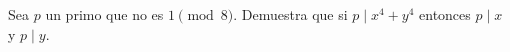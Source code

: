 \begin{problem}
    Sea $p$ un primo que no es $1 \pmod 8$. Demuestra que si $p \mid x^4+y^4$ entonces $p \mid x$ y $p\mid y$.
    \label{25EN2_2_5}
\end{problem}
